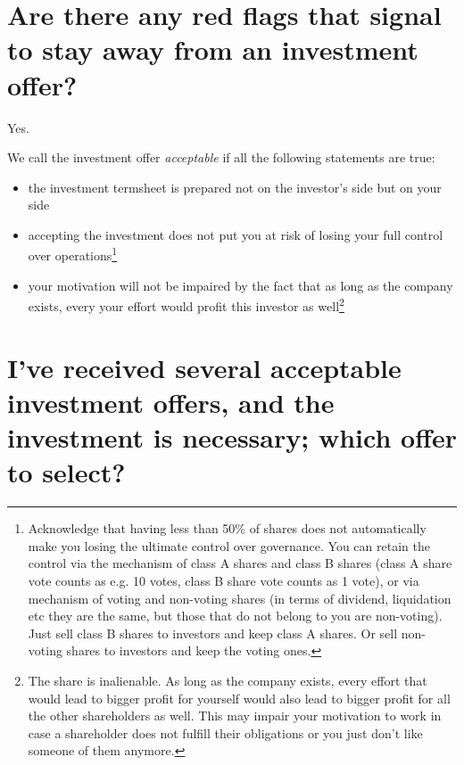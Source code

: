 \documentclass[11pt]{article}
\theoremstyle{remark}
\theoremstyle{definition}
\begin{document}
\section{Are there any red flags that signal to stay away from an investment offer?}

Yes. 

We call the investment offer \textit{acceptable} if all the following statements are true: 

\begin{itemize}

\item the investment termsheet is prepared not on the investor's side but on your side

\item accepting the investment does not put you at risk of losing your full control over operations\footnote{Acknowledge that having less than 50\% of shares does not automatically make you losing the ultimate control over governance. You can retain the control via the mechanism of class A shares and class B shares (class A share vote counts as e.g. 10 votes, class B share vote counts as 1 vote), or via mechanism of voting and non-voting shares (in terms of dividend, liquidation etc they are the same, but those that do not belong to you are non-voting). Just sell class B shares to investors and keep class A shares. Or sell non-voting shares to investors and keep the voting ones.} 


\item your motivation will not be impaired by the fact that as long as the company exists, every your effort would profit this investor as well\footnote{The share is inalienable. As long as the company exists, every effort that would lead to bigger profit for yourself would also lead to bigger profit for all the other shareholders as well. This may impair your motivation to work in case a shareholder does not fulfill their obligations or you just don't like someone of them anymore.} 






\end{itemize}




\section{I've received several acceptable investment offers, and the investment is necessary; which offer to select?}
\end{document}

